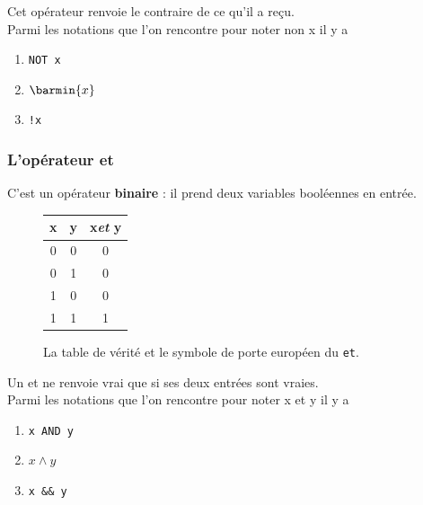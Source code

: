 Cet opérateur renvoie \og le contraire de ce qu'il a reçu\fg{}.\\
Parmi les notations que l'on rencontre pour noter \og non x\fg{} il y a
\begin{enumerate}[--]
    \item 	 \texttt{NOT x}
    \item 	$\barmin{x}$
    \item 	\texttt{!x}
\end{enumerate}


\subsubsection*{L'opérateur \og et\fg{}}

C'est un opérateur \textbf{binaire} : il prend deux variables booléennes en entrée.

\begin{figure}[H]
    \begin{center}
        \begin{tabular}{|c|c|c|}
            \hline\rowcolor{UGLiOrange}
            {\boxfont\color{white}x} & {\boxfont\color{white}y} & {\boxfont\color{white}x\textit{et} y} \\
            \hline
            0                        & 0                        & 0                                     \\
            \hline
            0                        & 1                        & 0                                     \\
            \hline
            1                        & 0                        & 0                                     \\
            \hline
            1                        & 1                        & 1                                     \\
            \hline
        \end{tabular}
        \hspace{3em}
    \end{center}
    \caption*{La table de vérité et le symbole de porte européen du \texttt{et}.}
\end{figure}
Un \og et\fg{} ne renvoie vrai que si ses deux entrées sont vraies.\\
Parmi les notations que l'on rencontre pour noter \og x et y\fg{} il y a
\begin{enumerate}[--]
    \item 	 \texttt{x AND y}
    \item 	$x\wedge y$
    \item 	\texttt{x \&\& y}
\end{enumerate}


